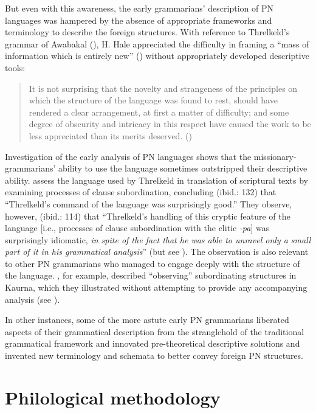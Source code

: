 But even with this awareness, the early grammarians' description of PN languages was hampered by the absence of appropriate frameworks and terminology to describe the foreign structures. With reference to Threlkeld’s grammar of Awabakal (\citeyear{threlkeld_australian_1834}), H. Hale appreciated the difficulty in framing a “mass of information which is entirely new” (\citealt[482]{threlkeld_1846}) without appropriately developed descriptive tools: 
\begin{quote}
    It is not surprising that the novelty and strangeness of the principles on which the structure of the language was found to rest, should have rendered a clear arrangement, at first a matter of difficulty; and some degree of obscurity and intricacy in this respect have caused the work to be less appreciated than its merits deserved. (\citealt[482]{threlkeld_1846})
\end{quote}

Investigation of the early analysis of PN languages shows that the missionary-grammarians' ability to use the language sometimes outstripped their descriptive ability. \citet{wafer_waiting_2011} assess the language used by Threlkeld in translation of scriptural texts by examining processes of clause subordination, concluding (ibid.: 132) that “Threlkeld’s command of the language was surprisingly good.” They observe, however, (ibid.: 114) that “Threlkeld’s handling of this cryptic feature of the language [i.e., processes of clause subordination with the clitic \textit{-pa}] was surprisingly idiomatic, \textit{in spite of the fact that he was able to unravel only a small part of it in his grammatical analysis}” (but see ). The observation is also relevant to other PN grammarians who managed to engage deeply with the structure of the language. \citet[13]{teichelmann_outlines_1840}, for example, described “observing” subordinating structures in Kaurna, which they illustrated without attempting to provide any accompanying analysis (see ).

In other instances, some of the more astute early PN grammarians liberated aspects of their grammatical description from the stranglehold of the traditional grammatical framework and innovated pre-theoretical descriptive solutions and invented new terminology and schemata to better convey foreign PN structures.

\section{Philological methodology}
\label{sec:key:2.3}

